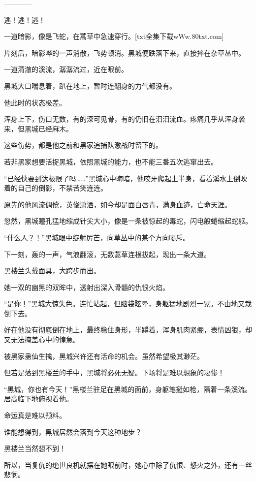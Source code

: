 
\begin{this_body}

------------

逃！逃！逃！

一道暗影，像是飞蛇，在蒿草中急速穿行。[txt全集下载wWw.80txt.com]

片刻后，暗影哗的一声消散，飞势顿消。黑城便跌落下来，直接摔在杂草丛中。

一道清澈的溪流，潺潺流过，近在眼前。

黑城大口喘息着，趴在地上，暂时连翻身的力气都没有。

他此时的状态极差。

浑身上下，伤口无数，有的深可见骨，有的仍旧在汩汩流血。疼痛几乎从浑身袭来，但黑城已经麻木。

这些伤势，都是他之前和黑家追捕队激战时留下的。

若非黑家想要活捉黑城，依照黑城的能力，也不能三番五次逃窜出去。

“已经快要到达极限了吗……”黑城心中晦暗，他咬牙爬起上半身，看着溪水上倒映着的自己的倒影，不禁苦笑连连。

原先的他风流倜傥，英俊潇洒，如今却是面白唇青，满身血迹，亡命天涯。

忽然，黑城瞳孔猛地缩成针尖大小，像是一条被惊起的毒蛇，闪电般蜷缩起蛇躯。

“什么人？！”黑城眼中绽射厉芒，向草丛中的某个方向喝斥。

下一刻，轰的一声，气浪翻滚，无数蒿草连根拔起，现出一条大道。

黑楼兰头戴面具，大跨步而出。

她一双的幽黑的双眸中，透射出深入骨髓的仇恨火焰。

“是你！”黑城大惊失色。连忙站起，但脑袋眩晕，身躯猛地剧烈一晃。不由地又栽倒下去。

好在他没有彻底倒在地上，最终稳住身形，半蹲着，浑身肌肉紧绷，表情凶狠，却又无法掩盖心中的惶急。

被黑家蛊仙生擒，黑城兴许还有活命的机会。虽然希望极其渺茫。

但若是落到黑楼兰的手中，黑城将必死无疑。下场将是难以想象的凄惨！

“黑城，你也有今天！”黑楼兰驻足在黑城的面前，身躯笔挺如枪，隔着一条溪流。居高临下地俯视着他。

命运真是难以预料。

谁能想得到，黑城居然会落到今天这种地步？

黑楼兰当然想不到！

所以，当复仇的绝世良机就摆在她眼前时，她心中除了仇恨、怒火之外，还有一丝悲悯。


\end{this_body}
